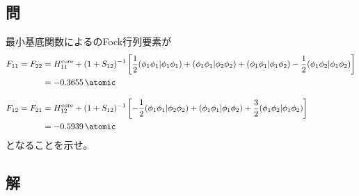 \subsection{問}
最小基底関数によるのFock行列要素が
\begin{align}
	F_{11}
=
	F_{22}
&=
	H^{\rm core}_{11}
	+
	(1+S_{12})^{-1}
	\left[
		\frac{1}{2}
		\spacetwo{\phi_1\phi_1}{\phi_1\phi_1}
		+
		\spacetwo{\phi_1\phi_1}{\phi_2\phi_2}
		+
		\spacetwo{\phi_1\phi_1}{\phi_1\phi_2}
		-
		\frac{1}{2}
		\spacetwo{\phi_1\phi_2}{\phi_1\phi_2}
	\right] \\
&=
	\SI{-0.3655}{\atomic} \\[3mm]
%
%
	F_{12}
=
	F_{21}
&=
	H^{\rm core}_{12}
	+
	(1+S_{12})^{-1}
	\left[
		-
		\frac{1}{2}
		\spacetwo{\phi_1\phi_1}{\phi_2\phi_2}
		+
		\spacetwo{\phi_1\phi_1}{\phi_1\phi_2}
		+
		\frac{3}{2}
		\spacetwo{\phi_1\phi_2}{\phi_1\phi_2}
	\right] \\
%
%
&=
	\SI{-0.5939}{\atomic}
\end{align}
となることを示せ。

\subsection{解}



